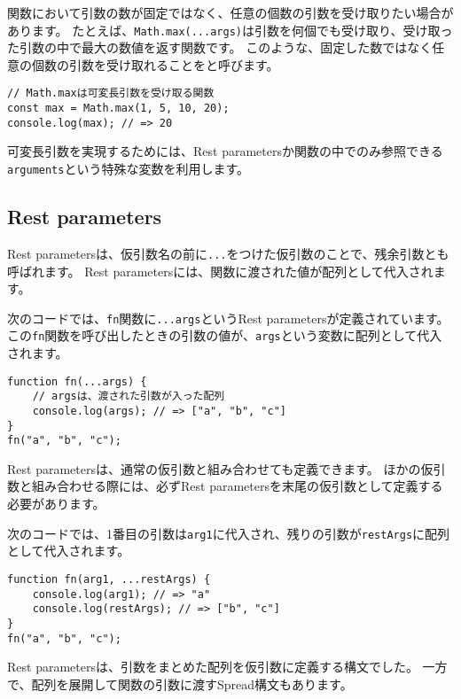関数において引数の数が固定ではなく、任意の個数の引数を受け取りたい場合があります。
たとえば、\texttt{Math.max(...args)}は引数を何個でも受け取り、受け取った引数の中で最大の数値を返す関数です。
このような、固定した数ではなく任意の個数の引数を受け取れることを\textbf{}と呼びます。

\begin{lstlisting}
// Math.maxは可変長引数を受け取る関数
const max = Math.max(1, 5, 10, 20);
console.log(max); // => 20
\end{lstlisting}

可変長引数を実現するためには、Rest
parametersか関数の中でのみ参照できる\texttt{arguments}という特殊な変数を利用します。

\hypertarget{rest-parameters}{%
\subsection[Rest parameters]{Rest parameters\,\protect{}}\label{rest-parameters}}

Rest
parametersは、仮引数名の前に\texttt{...}をつけた仮引数のことで、残余引数とも呼ばれます。
Rest parametersには、関数に渡された値が配列として代入されます。

次のコードでは、\texttt{fn}関数に\texttt{...args}というRest
parametersが定義されています。
この\texttt{fn}関数を呼び出したときの引数の値が、\texttt{args}という変数に配列として代入されます。

\begin{lstlisting}
function fn(...args) {
    // argsは、渡された引数が入った配列
    console.log(args); // => ["a", "b", "c"]
}
fn("a", "b", "c");
\end{lstlisting}

Rest parametersは、通常の仮引数と組み合わせても定義できます。
ほかの仮引数と組み合わせる際には、必ずRest
parametersを末尾の仮引数として定義する必要があります。

次のコードでは、1番目の引数は\texttt{arg1}に代入され、残りの引数が\texttt{restArgs}に配列として代入されます。

\begin{lstlisting}
function fn(arg1, ...restArgs) {
    console.log(arg1); // => "a"
    console.log(restArgs); // => ["b", "c"]
}
fn("a", "b", "c");
\end{lstlisting}

Rest parametersは、引数をまとめた配列を仮引数に定義する構文でした。
一方で、配列を展開して関数の引数に渡すSpread構文もあります。

